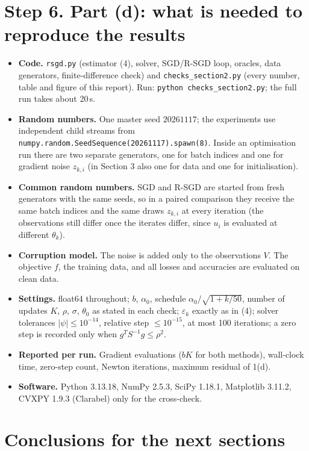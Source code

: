 \documentclass[11pt,a4paper]{article}
\begin{document}
\section*{Step 6. Part (d): what is needed to reproduce the results}

\begin{itemize}
\item \textbf{Code.} \texttt{rsgd.py} (estimator (4), solver, SGD/R-SGD loop, oracles,
data generators, finite-difference check) and \texttt{checks\_section2.py} (every
number, table and figure of this report). Run: \texttt{python checks\_section2.py};
the full run takes about 20\,s.
\item \textbf{Random numbers.} One master seed $20261117$; the experiments use
independent child streams from \texttt{numpy.random.SeedSequence(20261117).spawn(8)}.
Inside an optimisation run there are two separate generators, one for batch indices
and one for gradient noise $z_{k,i}$ (in Section 3 also one for data and one for
initialisation).
\item \textbf{Common random numbers.} SGD and R-SGD are started from fresh generators
with the same seeds, so in a paired comparison they receive the same batch indices and
the same draws $z_{k,i}$ at every iteration (the observations still differ once the
iterates differ, since $u_i$ is evaluated at different $\theta_k$).
\item \textbf{Corruption model.} The noise is added only to the observations $V$.
The objective $f$, the training data, and all losses and accuracies are evaluated on
clean data.
\item \textbf{Settings.} float64 throughout; $b$, $\alpha_0$, schedule
$\alpha_0/\sqrt{1+k/50}$, number of updates $K$, $\rho$, $\sigma$, $\theta_0$ as stated in
each check; $\varepsilon_k$ exactly as in (4); solver tolerances
$|\psi|\le10^{-14}$, relative step $\le10^{-15}$, at most 100 iterations; a zero step is
recorded only when $g^TS^{-1}g\le\rho^2$.
\item \textbf{Reported per run.} Gradient evaluations ($bK$ for both methods),
wall-clock time, zero-step count, Newton iterations, maximum residual of 1(d).
\item \textbf{Software.} Python 3.13.18, NumPy 2.5.3, SciPy 1.18.1, Matplotlib 3.11.2,
CVXPY 1.9.3 (Clarabel) only for the cross-check.
\end{itemize}

\section*{Conclusions for the next sections}
\end{document}
